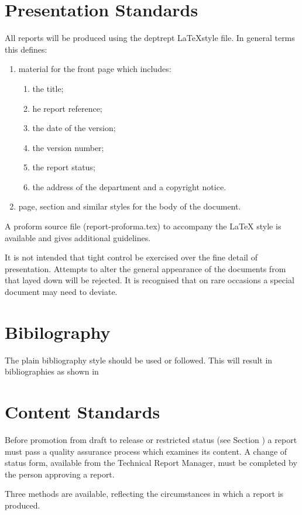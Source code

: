 \documentclass[a4paper, 12pt]{article}
\begin{document}
\begin{multicols}{2}
\section{Presentation Standards}
\label{sec:presstand}
All reports will be produced using the deptrept \LaTeX style file.
\newline
\indent In general terms this defines:
\begin{enumerate}
\item material for the front page which includes:
\begin{enumerate}
\item the title;
\item he report reference;
\item the date of the version;
\item the version number;
\item the report status;
\item the address of the department and a copyright notice.
\end{enumerate}
\item page, section and similar styles for the body of the document.
\end{enumerate}
A proform source file (report-proforma.tex) to
accompany the LaTeX style is available and gives additional guidelines.

It is not intended that tight control be exercised over
the fine detail of presentation. Attempts to alter the
general appearance of the documents from that layed
down will be rejected. It is recognised that on rare
occasions a special document may need to deviate.

\section{Bibilography}
The plain bibliography style should be used or followed. This will result in bibliographies 
as shown in \cite{1}
\section{Content Standards}
\label{sec:contstand}
Before promotion from draft to release or restricted
status (see Section ) a report must pass a quality assurance process which examines its content. A change of
status form, available from the Technical Report Manager, must be completed by the person approving a report.

Three methods are available, reflecting the circumstances in which a report is produced.


\end{multicols}
\end{document}
